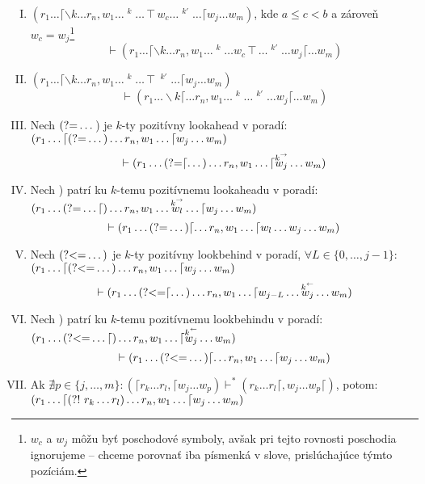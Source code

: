 \begin{df}
\begin{enumerate}[I.]
\item $\displaystyle{(r_1 \dots \lceil \backslash k \dots r_n,w_1\dots\mathop{w_a}^k\ldots \intercal w_c \dots \mathop{w_b}^{k'} \dots \lceil w_j\dots w_m)}$, kde $a\leq c < b$ a zároveň $w_c = w_j$\footnote{$w_c$ a $w_j$ môžu byť poschodové symboly, avšak pri tejto rovnosti poschodia ignorujeme -- chceme porovnať iba písmenká v slove, prislúchajúce týmto pozíciám.}
$$\vdash(r_1 \dots \lceil \backslash k \dots r_n,w_1\dots\mathop{w_a}^k\dots w_c\intercal \dots \mathop{w_b}^{k'} \dots  w_j\lceil\dots w_m)$$
\item $\displaystyle{(r_1 \dots \lceil \backslash k \dots r_n,w_1\dots\mathop{w_a}^k\ldots \intercal  \mathop{w_b}^{k'} \dots \lceil w_j\dots w_m)}$
$$\vdash(r_1 \dots  \backslash k \lceil \dots r_n,w_1\dots\mathop{w_a}^k\dots \mathop{w_b}^{k'} \dots  w_j\lceil\dots w_m)$$
\item Nech $\text{(?=} \dots$) je $k$-ty pozitívny lookahead v poradí: 
\\ $\displaystyle{(r_1\dots \lceil \text{(?=}\dots) \dots r_n, w_1\dots\lceil w_j\dots w_m )}$
$$ \vdash(r_1\dots \text{(?=}\lceil\dots) \dots r_n, w_1\dots\lceil \mathop{w_j}^{\mathop{k}^\rightarrow}\dots w_m ) $$
\item Nech ) patrí ku $k$-temu pozitívnemu lookaheadu v poradí: 
\\ $\displaystyle{(r_1\dots \text{(?=}\dots\lceil) \dots r_n, w_1\dots \mathop{w_l}^{\mathop{k}^\rightarrow}\dots\lceil w_j\dots w_m )} $
$$ \vdash(r_1\dots \text{(?=}\dots)\lceil \dots r_n, w_1\dots \lceil w_l \dots w_j\dots w_m ) $$
\item Nech $\text{(?\textless =}\dots)$ je $k$-ty pozitívny lookbehind v poradí, $\forall L\in\lbrace 0,\dots, j-1\rbrace$:
\\ $\displaystyle{(r_1\dots \lceil \text{(?\textless =}\dots) \dots r_n, w_1\dots\lceil w_j\dots w_m )}$
$$ \vdash (r_1\dots \text{(?\textless =}\lceil\dots) \dots r_n, w_1\dots\lceil w_{j-L}\dots \mathop{w_j}^{\mathop{k}^\leftarrow} \dots w_m ) $$
\item Nech ) patrí ku $k$-temu pozitívnemu lookbehindu v poradí:
\\ $\displaystyle{(r_1\dots \text{(?\textless =}\dots\lceil) \dots r_n, w_1\dots \lceil \mathop{w_j}^{\mathop{k}^\leftarrow} \dots w_m )}$
$$ \vdash(r_1\dots \text{(?\textless =}\dots)\lceil \dots r_n, w_1 \dots \lceil w_j \dots w_m ) $$
\item Ak $\nexists p \in \lbrace j,\dots,m\rbrace: (\lceil r_k\dots r_l,\lceil w_j\dots w_p) \vdash^* (r_k\dots r_l\lceil, w_j\dots w_p \lceil)$, potom:
\\$\displaystyle{(r_1\dots\lceil \text{(?!~}r_{k}\dots r_{l} ) \dots r_n, w_1\dots \lceil w_j \dots w_m)}$

\end{enumerate}
\end{df}
